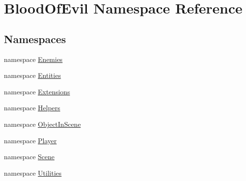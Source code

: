 \hypertarget{namespace_blood_of_evil}{}\section{Blood\+Of\+Evil Namespace Reference}
\label{namespace_blood_of_evil}
\subsection*{Namespaces}
\begin{DoxyCompactItemize}
\item 
namespace \hyperlink{namespace_blood_of_evil_1_1_enemies}{Enemies}
\item 
namespace \hyperlink{namespace_blood_of_evil_1_1_entities}{Entities}
\item 
namespace \hyperlink{namespace_blood_of_evil_1_1_extensions}{Extensions}
\item 
namespace \hyperlink{namespace_blood_of_evil_1_1_helpers}{Helpers}
\item 
namespace \hyperlink{namespace_blood_of_evil_1_1_object_in_scene}{Object\+In\+Scene}
\item 
namespace \hyperlink{namespace_blood_of_evil_1_1_player}{Player}
\item 
namespace \hyperlink{namespace_blood_of_evil_1_1_scene}{Scene}
\item 
namespace \hyperlink{namespace_blood_of_evil_1_1_utilities}{Utilities}
\end{DoxyCompactItemize}
